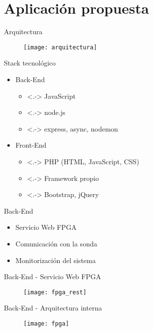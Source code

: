 \section{Aplicación propuesta}

\begin{frame}{Arquitectura}
  \begin{figure}
    \texttt{[image: arquitectura]}
  \end{figure}
\end{frame}

\begin{frame}{Stack tecnológico}
  \begin{itemize}[<+->]
    \item \alert{Back-End}
    \begin{itemize}
      \item<.-> JavaScript
      \item<.-> node.js
      \item<.-> express, async, nodemon
    \end{itemize}
    \item \alert{Front-End}
    \begin{itemize}
      \item<.-> PHP (HTML, JavaScript, CSS)
      \item<.-> Framework propio
      \item<.-> Bootstrap, jQuery
    \end{itemize}
  \end{itemize}
\end{frame}

\begin{frame}{Back-End}
  \begin{itemize}[<alert@+>]
    \item Servicio Web FPGA
    \item Comunicación con la sonda
    \item Monitorización del sistema
  \end{itemize}
\end{frame}

\begin{frame}{Back-End - Servicio Web FPGA}
  \begin{figure}
    \texttt{[image: fpga\_rest]}
  \end{figure}
\end{frame}

\begin{frame}{Back-End - Arquitectura interna}
  \begin{figure}
    \texttt{[image: fpga]}
  \end{figure}
\end{frame}

